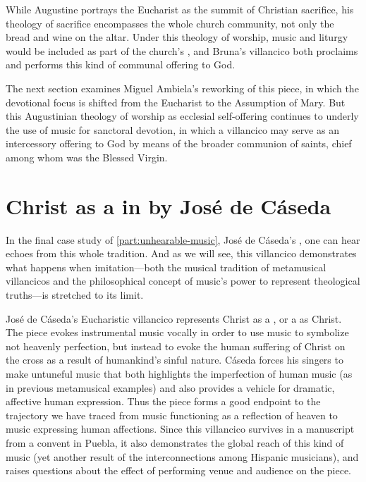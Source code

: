 While Augustine portrays the Eucharist as the summit of Christian sacrifice, his theology of sacrifice encompasses the whole church community, not only the bread and wine on the altar.
Under this theology of worship, music and liturgy would be included as part of the church's , and Bruna's villancico both proclaims and performs this kind of communal offering to God.

The next section examines Miguel Ambiela's reworking of this piece, in which the devotional focus is shifted from the Eucharist to the Assumption of Mary.
But this Augustinian theology of worship as ecclesial self-offering continues to underly the use of music for sanctoral devotion, in which a villancico may serve as an intercessory offering to God by means of the broader communion of saints, chief among whom was the Blessed Virgin. 

\section{Christ as a  in  by José de Cáseda}
\label{sec:Caseda}

In the final case study of \cref{part:unhearable-music}, José de Cáseda's , one can hear echoes from this whole tradition.
And as we will see, this villancico demonstrates what happens when imitation---both the musical tradition of metamusical villancicos and the philosophical concept of music's power to represent theological truths---is stretched to its limit.

José de Cáseda's Eucharistic villancico  represents Christ as a , or a  as Christ.
The piece evokes instrumental music vocally in order to use music to symbolize not heavenly perfection, but instead to evoke the human suffering of Christ on the cross as a result of humankind's sinful nature.
Cáseda forces his singers to make untuneful music that both highlights the imperfection of human music (as in previous metamusical examples) and also provides a vehicle for dramatic, affective human expression. 
Thus the piece forms a good endpoint to the trajectory we have traced from music functioning as a reflection of heaven to music expressing human affections.
Since this villancico survives in a manuscript from a convent in Puebla, it also demonstrates the global reach of this kind of music (yet another result of the interconnections among Hispanic musicians), and raises questions about the effect of performing venue and audience on the piece.


